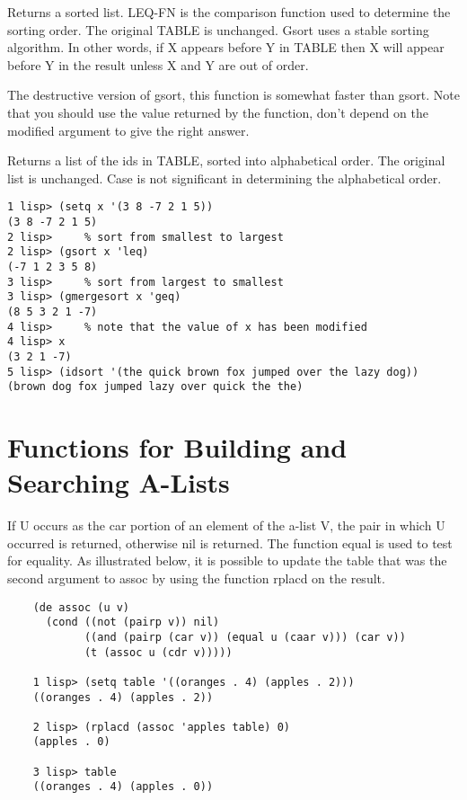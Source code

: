 {    Returns a sorted list.  LEQ-FN is  the  comparison  function
    used  to determine the sorting order.  The original TABLE is
    unchanged.  Gsort uses a stable sorting algorithm.  In other
    words, if X appears before Y in TABLE  then  X  will  appear
    before Y in the result unless X and Y are out of order.
}

{    The  destructive version of gsort, this function is somewhat
    faster than gsort.  Note  that  you  should  use  the  value
    returned  by  the  function,  don't  depend  on the modified
    argument to give the right answer.
}

{    Returns a list of the ids in TABLE, sorted into alphabetical
    order.  The  original  list  is  unchanged.    Case  is  not
    significant in determining the alphabetical order.
}
\begin{verbatim}
1 lisp> (setq x '(3 8 -7 2 1 5))
(3 8 -7 2 1 5)
2 lisp>     % sort from smallest to largest
2 lisp> (gsort x 'leq)
(-7 1 2 3 5 8)
3 lisp>     % sort from largest to smallest
3 lisp> (gmergesort x 'geq)
(8 5 3 2 1 -7)
4 lisp>     % note that the value of x has been modified
4 lisp> x
(3 2 1 -7)
5 lisp> (idsort '(the quick brown fox jumped over the lazy dog))
(brown dog fox jumped lazy over quick the the)
\end{verbatim}
\section{Functions for Building and Searching A-Lists}

{    If  U  occurs as the car portion of an element of the a-list
    V, the pair in which  U occurred is returned, otherwise  nil
    is  returned.    The  function  equal  is  used  to test for
    equality.  As illustrated below, it is  possible  to  update
    the table that was the second argument to assoc by using the
    function rplacd on the result.
}
\begin{verbatim}
    (de assoc (u v)
      (cond ((not (pairp v)) nil)
            ((and (pairp (car v)) (equal u (caar v))) (car v))
            (t (assoc u (cdr v)))))

    1 lisp> (setq table '((oranges . 4) (apples . 2)))
    ((oranges . 4) (apples . 2))

    2 lisp> (rplacd (assoc 'apples table) 0)
    (apples . 0)

    3 lisp> table
    ((oranges . 4) (apples . 0))
\end{verbatim}

